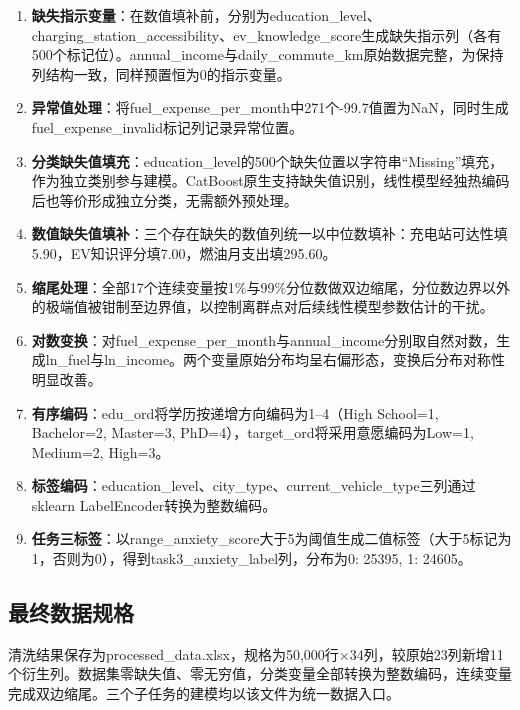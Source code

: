 \begin{enumerate}[itemsep=0pt]
\item \textbf{缺失指示变量}：在数值填补前，分别为education\_level、charging\_station\_accessibility、ev\_knowledge\_score生成缺失指示列（各有500个标记位）。annual\_income与daily\_commute\_km原始数据完整，为保持列结构一致，同样预置恒为0的指示变量。
\item \textbf{异常值处理}：将fuel\_expense\_per\_month中271个-99.7值置为NaN，同时生成fuel\_expense\_invalid标记列记录异常位置。
\item \textbf{分类缺失值填充}：education\_level的500个缺失位置以字符串``Missing''填充，作为独立类别参与建模。CatBoost原生支持缺失值识别，线性模型经独热编码后也等价形成独立分类，无需额外预处理。
\item \textbf{数值缺失值填补}：三个存在缺失的数值列统一以中位数填补：充电站可达性填5.90，EV知识评分填7.00，燃油月支出填295.60。
\item \textbf{缩尾处理}：全部17个连续变量按1\%与99\%分位数做双边缩尾，分位数边界以外的极端值被钳制至边界值，以控制离群点对后续线性模型参数估计的干扰。
\item \textbf{对数变换}：对fuel\_expense\_per\_month与annual\_income分别取自然对数，生成ln\_fuel与ln\_income。两个变量原始分布均呈右偏形态，变换后分布对称性明显改善。
\item \textbf{有序编码}：edu\_ord将学历按递增方向编码为1--4（High School=1, Bachelor=2, Master=3, PhD=4），target\_ord将采用意愿编码为Low=1, Medium=2, High=3。
\item \textbf{标签编码}：education\_level、city\_type、current\_vehicle\_type三列通过sklearn LabelEncoder转换为整数编码。
\item \textbf{任务三标签}：以range\_anxiety\_score大于5为阈值生成二值标签（大于5标记为1，否则为0），得到task3\_anxiety\_label列，分布为0: 25395, 1: 24605。
\end{enumerate}

\subsection{最终数据规格}

清洗结果保存为processed\_data.xlsx，规格为50,000行$\times$34列，较原始23列新增11个衍生列。数据集零缺失值、零无穷值，分类变量全部转换为整数编码，连续变量完成双边缩尾。三个子任务的建模均以该文件为统一数据入口。
